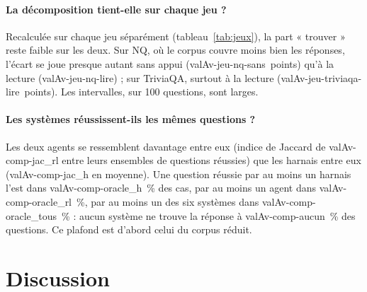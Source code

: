 \documentclass[11pt,a4paper]{article}
\newcommand{\valAv}[1]{\csname valAv-#1\endcsname}             %
\begin{document}
\begin{table}[ht]
\centering\small

\caption{Sensibilité de HA1 à la métrique, et tailles d'effet. Écart moyen entre agents (A4, A5) et harnais (A1 à A3) sur 200 questions, intervalle bootstrap apparié. Odds ratio de McNemar avec intervalle exact.}
\label{tab:sensibilite}
\end{table}

\paragraph{La décomposition tient-elle sur chaque jeu ?} Recalculée sur chaque jeu séparément (tableau~\ref{tab:jeux}), la part « trouver » reste faible sur les deux. Sur NQ, où le corpus couvre moins bien les réponses, l'écart se joue presque autant sans appui (\valAv{jeu-nq-sans}~points) qu'à la lecture (\valAv{jeu-nq-lire}) ; sur TriviaQA, surtout à la lecture (\valAv{jeu-triviaqa-lire}~points). Les intervalles, sur 100 questions, sont larges.

\begin{table}[ht]
\centering\small

\caption{Décomposition de l'écart d'EM entre agents et harnais, jeu par jeu, en points ; intervalle bootstrap à 95~\% sur les 100 questions du jeu.}
\label{tab:jeux}
\end{table}

\paragraph{Les systèmes réussissent-ils les mêmes questions ?} Les deux agents se ressemblent davantage entre eux (indice de Jaccard de \valAv{comp-jac_rl} entre leurs ensembles de questions réussies) que les harnais entre eux (\valAv{comp-jac_h} en moyenne). Une question réussie par au moins un harnais l'est dans \valAv{comp-oracle_h}~\% des cas, par au moins un agent dans \valAv{comp-oracle_rl}~\%, par au moins un des six systèmes dans \valAv{comp-oracle_tous}~\% : aucun système ne trouve la réponse à \valAv{comp-aucun}~\% des questions. Ce plafond est d'abord celui du corpus réduit.

\FloatBarrier
\section{Discussion}\label{sec:discussion}
\end{document}
